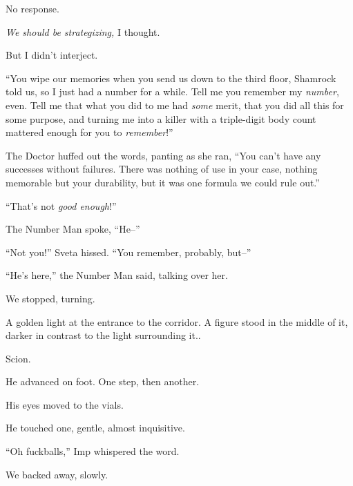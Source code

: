No response.



\emph{We should be strategizing,} I thought.



But I didn't interject.



``You wipe our memories when you send us down to the third floor, Shamrock told us, so I just had a number for a while.  Tell me you remember my \emph{number}, even.  Tell me that what you did to me had \emph{some} merit, that you did all this for some purpose, and turning me into a killer with a triple-digit body count mattered enough for you to \emph{remember}!''



The Doctor huffed out the words, panting as she ran, ``You can't have any successes without failures.  There was nothing of use in your case, nothing memorable but your durability, but it was one formula we could rule out.''



``That's not \emph{good enough}!''



The Number Man spoke, ``He--''



``Not you!'' Sveta hissed.  ``You remember, probably, but--''



``He's here,'' the Number Man said, talking over her.



We stopped, turning.



A golden light at the entrance to the corridor.  A figure stood in the middle of it, darker in contrast to the light surrounding it..



Scion.



He advanced on foot.  One step, then another.



His eyes moved to the vials.



He touched one, gentle, almost inquisitive.



``Oh fuckballs,'' Imp whispered the word.



We backed away, slowly.



